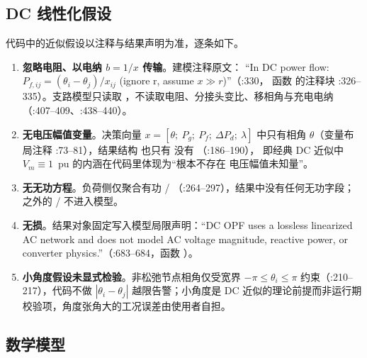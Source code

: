 \subsection{DC 线性化假设}\label{subsec:dcopf-assumptions}

代码中的近似假设以注释与结果声明为准，逐条如下。

\begin{enumerate}
  \item \textbf{忽略电阻、以电纳 $b=1/x$ 传输}。建模注释原文：
        ``In DC power flow: $P_{f,ij}=(\theta_i-\theta_j)/x_{ij}$ (ignore r,
        assume $x \gg r$)''（:330，
        函数  的注释块 :326--335）。支路模型只读取
        ，不读取电阻、分接头变比、移相角与充电电纳
        （:407--409、:438--440）。
  \item \textbf{无电压幅值变量}。决策向量 $x=[\theta;\ P_g;\ P_f;\ \Delta P_d;\
        \lambda]$ 中只有相角 $\theta$（变量布局注释 :73--81），结果结构
         也只有  没有 
        （:186--190），
        即经典 DC 近似中 $V_m\equiv 1$~pu 的内涵在代码里体现为“根本不存在
        电压幅值未知量”。
  \item \textbf{无无功方程}。负荷侧仅聚合有功 /
        （:264--297），结果中没有任何无功字段； 之外的
        / 不进入模型。
  \item \textbf{无损}。结果对象固定写入模型局限声明：``DC OPF uses a lossless
        linearized AC network and does not model AC voltage magnitude, reactive
        power, or converter physics.''（:683--684，函数
        ）。
  \item \textbf{小角度假设未显式检验}。非松弛节点相角仅受宽界
        $-\pi\le\theta_i\le\pi$ 约束（:210--217），代码不做
        $|\theta_i-\theta_j|$ 越限告警；小角度是 DC 近似的理论前提而非运行期
        校验项，角度张角大的工况误差由使用者自担。
\end{enumerate}

\subsection{数学模型}\label{subsec:dcopf-model}

